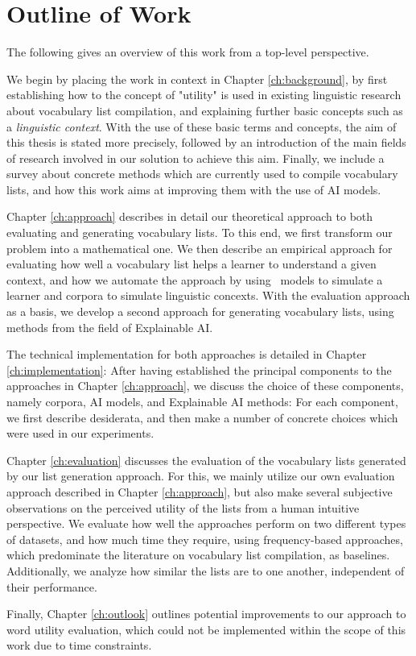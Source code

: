 

\section{Outline of Work}

The following gives an overview of this work from a top-level perspective.

We begin by placing the work in context in Chapter \ref{ch:background}, by first establishing how to the concept of "utility" is used in existing linguistic research about vocabulary list compilation, and explaining further basic concepts such as a \textit{linguistic context}.
With the use of these basic terms and concepts, the aim of this thesis is stated more precisely, followed by an introduction of the main fields of research involved in our solution to achieve this aim.
Finally, we include a survey about concrete methods which are currently used to compile vocabulary lists, and how this work aims at improving them with the use of AI models.

Chapter \ref{ch:approach} describes in detail our theoretical approach to both evaluating and generating vocabulary lists.
To this end, we first transform our problem into a mathematical one.
We then describe an empirical approach for evaluating how well a vocabulary list helps a learner to understand a given context, and how we automate the approach by using \AI\ models to simulate a learner and corpora to simulate linguistic concexts.
With the evaluation approach as a basis, we develop a second approach for generating vocabulary lists, using methods from the field of Explainable AI.

The technical implementation for both approaches is detailed in Chapter \ref{ch:implementation}:
After having established the principal components to the approaches in Chapter \ref{ch:approach}, we discuss the choice of these components, namely corpora, AI models, and Explainable AI methods:
For each component, we first describe desiderata, and then make a number of concrete choices which were used in our experiments.


Chapter \ref{ch:evaluation} discusses the evaluation of the vocabulary lists generated by our list generation approach.
For this, we mainly utilize our own evaluation approach described in Chapter \ref{ch:approach}, but also make several subjective observations on the perceived utility of the lists from a human intuitive perspective.
We evaluate how well the approaches perform on two different types of datasets, and how much time they require, using frequency-based approaches, which predominate the literature on vocabulary list compilation, as baselines.
Additionally, we analyze how similar the lists are to one another, independent of their performance.

Finally, Chapter \ref{ch:outlook} outlines potential improvements to our approach to word utility evaluation, which could not be implemented within the scope of this work due to time constraints.





